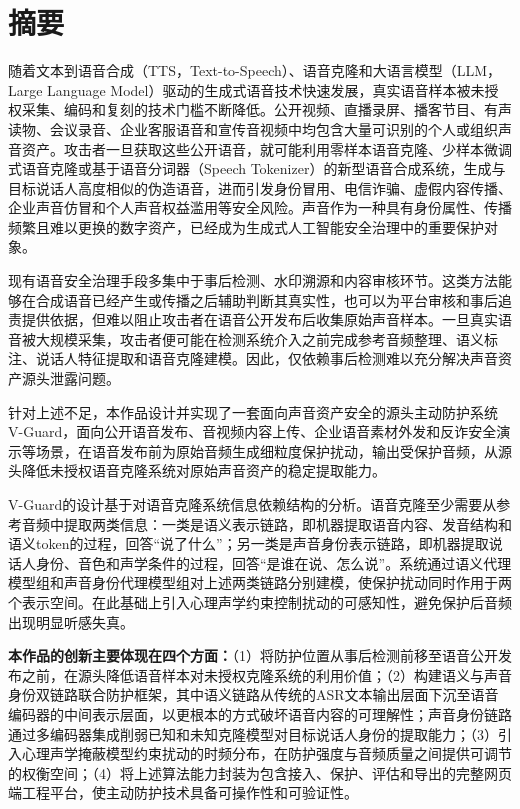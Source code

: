 \chapter*{摘要}

随着文本到语音合成（TTS，Text-to-Speech）、语音克隆和大语言模型（LLM，Large
Language
Model）驱动的生成式语音技术快速发展，真实语音样本被未授权采集、编码和复刻的技术门槛不断降低。公开视频、直播录屏、播客节目、有声读物、会议录音、企业客服语音和宣传音视频中均包含大量可识别的个人或组织声音资产。攻击者一旦获取这些公开语音，就可能利用零样本语音克隆、少样本微调式语音克隆或基于语音分词器（Speech
Tokenizer）的新型语音合成系统，生成与目标说话人高度相似的伪造语音，进而引发身份冒用、电信诈骗、虚假内容传播、企业声音仿冒和个人声音权益滥用等安全风险。声音作为一种具有身份属性、传播频繁且难以更换的数字资产，已经成为生成式人工智能安全治理中的重要保护对象。

现有语音安全治理手段多集中于事后检测、水印溯源和内容审核环节。这类方法能够在合成语音已经产生或传播之后辅助判断其真实性，也可以为平台审核和事后追责提供依据，但难以阻止攻击者在语音公开发布后收集原始声音样本。一旦真实语音被大规模采集，攻击者便可能在检测系统介入之前完成参考音频整理、语义标注、说话人特征提取和语音克隆建模。因此，仅依赖事后检测难以充分解决声音资产源头泄露问题。

针对上述不足，本作品设计并实现了一套面向声音资产安全的源头主动防护系统
V-Guard，面向公开语音发布、音视频内容上传、企业语音素材外发和反诈安全演示等场景，在语音发布前为原始音频生成细粒度保护扰动，输出受保护音频，从源头降低未授权语音克隆系统对原始声音资产的稳定提取能力。

V-Guard的设计基于对语音克隆系统信息依赖结构的分析。语音克隆至少需要从参考音频中提取两类信息：一类是语义表示链路，即机器提取语音内容、发音结构和语义token的过程，回答``说了什么''；另一类是声音身份表示链路，即机器提取说话人身份、音色和声学条件的过程，回答``是谁在说、怎么说''。系统通过语义代理模型组和声音身份代理模型组对上述两类链路分别建模，使保护扰动同时作用于两个表示空间。在此基础上引入心理声学约束控制扰动的可感知性，避免保护后音频出现明显听感失真。

\textbf{本作品的创新主要体现在四个方面：}（1）将防护位置从事后检测前移至语音公开发布之前，在源头降低语音样本对未授权克隆系统的利用价值；（2）构建语义与声音身份双链路联合防护框架，其中语义链路从传统的ASR文本输出层面下沉至语音编码器的中间表示层面，以更根本的方式破坏语音内容的可理解性；声音身份链路通过多编码器集成削弱已知和未知克隆模型对目标说话人身份的提取能力；（3）引入心理声学掩蔽模型约束扰动的时频分布，在防护强度与音频质量之间提供可调节的权衡空间；（4）将上述算法能力封装为包含接入、保护、评估和导出的完整网页端工程平台，使主动防护技术具备可操作性和可验证性。

